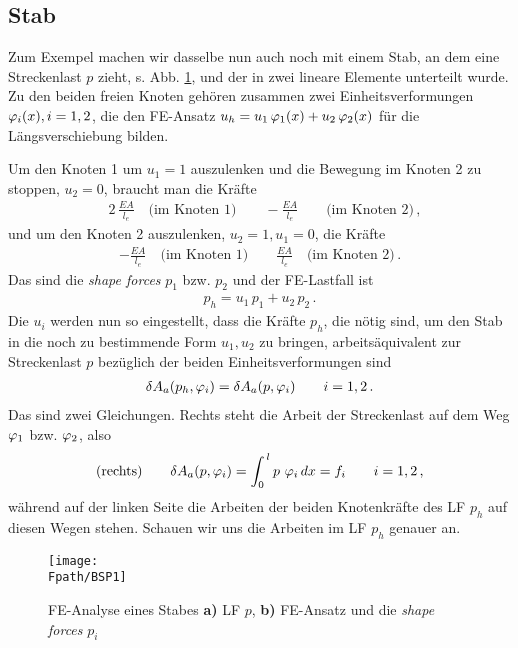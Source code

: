 {\textcolor{sectionTitleBlue}{\section{Stab}}}


Zum Exempel machen wir dasselbe nun auch noch mit einem Stab, an dem eine Streckenlast $p$ zieht, s. Abb. \ref{Bsp1}, und der in zwei lineare Elemente unterteilt wurde. Zu den beiden freien Knoten geh\"{o}ren zusammen zwei Einheitsverformungen $\varphi_i(x), i = 1,2$, die den FE-Ansatz $u_{h} = u_1 \,\varphi_1(x) + u_2 \,\varphi_2(x)$ f\"{u}r die L\"{a}ngsverschiebung bilden.

Um den Knoten 1 um $u_1 = 1$ auszulenken und die Bewegung im Knoten 2 zu stoppen, $u_2 = 0$, braucht man die Kr\"{a}fte
\begin{align}
&2\,\frac{EA}{l_e}\quad\text{(im Knoten 1)}\qquad  -\frac{EA}{l_e}\qquad\text{(im Knoten 2)}\,,
\end{align}
und um den Knoten 2 auszulenken, $u_2 = 1, u_1 = 0$, die Kr\"{a}fte
\begin{align}
 -\frac{EA}{l_e}\quad\text{(im Knoten 1)}\qquad \frac{EA}{l_e} \quad\text{(im Knoten 2)}\,.
\end{align}
Das sind die {\em shape forces\/} $p_1$ bzw. $p_2$ und der FE-Lastfall ist
\begin{align}
p_h = u_1\,p_1 + u_2\,p_2\,.
\end{align}
Die $u_i$ werden nun so eingestellt, dass die Kr\"{a}fte $p_h$, die n\"{o}tig sind, um den Stab in die noch zu bestimmende Form $u_1, u_2$ zu bringen, arbeits\"{a}quivalent zur Streckenlast $p$ bez\"{u}glich der beiden Einheitsverformungen sind
\begin{align}\label{101}
\delta A_a(p_{h} ,\varphi_i ) = \delta A_a(p,\varphi_i ) \qquad i = 1,2\,.
\end{align}
Das sind zwei Gleichungen. Rechts steht die Arbeit der Streckenlast auf dem Weg $\varphi_1$ bzw. $\varphi_2$, also
\begin{align}
\text{(rechts)}\qquad \delta A_a(p,\varphi_i ) = \int_0^{\,l} p\,\,\varphi_i \,dx = f_i \qquad i = 1,2\,,
\end{align}
w\"{a}hrend auf der linken Seite die Arbeiten der beiden Knotenkr\"{a}fte des LF $p_h$ auf diesen Wegen stehen. Schauen wir uns die Arbeiten im LF $p_h$ genauer an.
\begin{figure}[tbp] \centering
\if {} \sidecaption \fi
\texttt{[image: \\Fpath/BSP1]}
\caption{FE-Analyse eines Stabes {\bf a)} LF $p$, {\bf b)} FE-Ansatz und die {\em shape forces\/}
$p_i$} \label{Bsp1}
\end{figure}%

